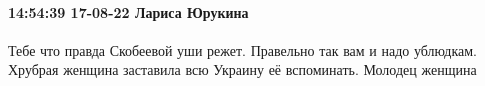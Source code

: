  
 
 
 
 

\paragraph{14:54:39 17-08-22 Лариса Юрукина}

Тебе что правда Скобеевой уши режет. Правельно так вам и надо ублюдкам. Хрубрая
женщина заставила всю Украину её вспоминать. Молодец женщина

